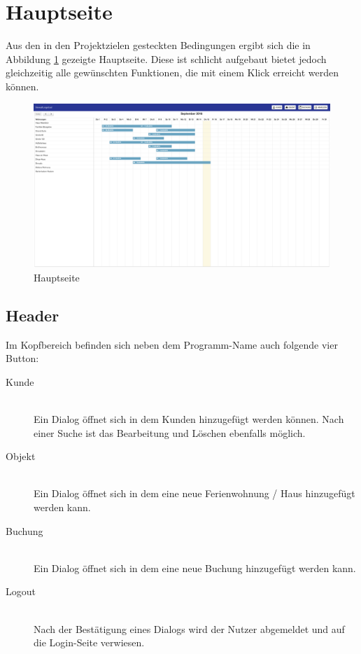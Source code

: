 \section{Hauptseite}
Aus den in den Projektzielen gesteckten Bedingungen ergibt sich die in Abbildung \ref{frontend_mainpage} gezeigte Hauptseite. Diese ist schlicht aufgebaut bietet jedoch gleichzeitig alle gewünschten Funktionen, die mit einem Klick erreicht werden können.

\begin{figure}[H]
\centering\includegraphics[width=1\textwidth]{images/frontend_mainpage.png}
\caption{Hauptseite}
\label{frontend_mainpage}
\end{figure}

\subsection{Header}
Im Kopfbereich befinden sich neben dem Programm-Name auch folgende vier Button:

\begin{description}
\item[Kunde]\hfill \\
Ein Dialog öffnet sich in dem Kunden hinzugefügt werden können. Nach einer Suche ist das Bearbeitung und Löschen ebenfalls möglich.
\item[Objekt]\hfill \\ 
Ein Dialog öffnet sich in dem eine neue Ferienwohnung / Haus hinzugefügt werden kann. 
\item[Buchung]\hfill \\ 
Ein Dialog öffnet sich in dem eine neue Buchung hinzugefügt werden kann. 
\item[Logout]\hfill \\ 
Nach der Bestätigung eines Dialogs wird der Nutzer abgemeldet und auf die Login-Seite verwiesen. 
\end{description}

